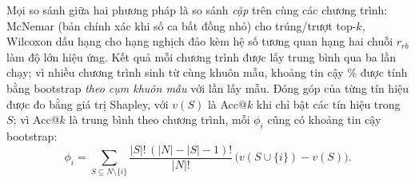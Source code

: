 Mọi so sánh giữa hai phương pháp là so sánh \emph{cặp} trên cùng các chương trình: McNemar (bản chính xác khi số ca
bất đồng nhỏ) cho trúng/trượt top-$k$, Wilcoxon dấu hạng cho hạng nghịch đảo kèm hệ số tương quan hạng hai chuỗi
$r_{rb}$ làm độ lớn hiệu ứng. Kết quả mỗi chương trình được lấy trung bình qua ba lần chạy; vì nhiều chương trình
sinh từ cùng khuôn mẫu, khoảng tin cậy \ConstCiLevel\% được tính bằng bootstrap \emph{theo cụm khuôn mẫu} với
\ConstBootstrapDraws{} lần lấy mẫu. Đóng góp của từng tín hiệu được đo bằng giá trị Shapley, với $v(S)$ là Acc@$k$ khi
chỉ bật các tín hiệu trong $S$; vì Acc@$k$ là trung bình theo chương trình, mỗi $\phi_i$ cũng có khoảng tin cậy bootstrap:
\begin{equation} \phi_i = \sum_{S \subseteq N\setminus\{i\}} \frac{|S|!\,(|N|-|S|-1)!}{|N|!}\,\bigl(v(S\cup\{i\}) - v(S)\bigr). \label{eq:shapley} \end{equation}
